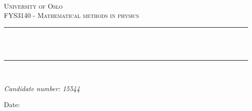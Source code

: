 \begin{titlepage}

\newcommand{\HRule}{\rule{\linewidth}{0.5mm}} %




\begin{center} %

\textsc{\LARGE \reporttype}\\[1.5cm]
\textsc{\Large University of Oslo}\\[0.5cm]
\textsc{\large FYS3140 - Mathematical methods in physics}\\[0.5cm]

\HRule \\[0.4cm]
{ \huge \bfseries \reporttitle}\\ %
\HRule \\[1.5cm]
\end{center}

\begin{flushleft} \large
\textit{Candidate number: 15544}\\
\end{flushleft}
\vspace{2cm}
\makeatletter
Date: \@date

\vfill %



\makeatother


\end{titlepage}
